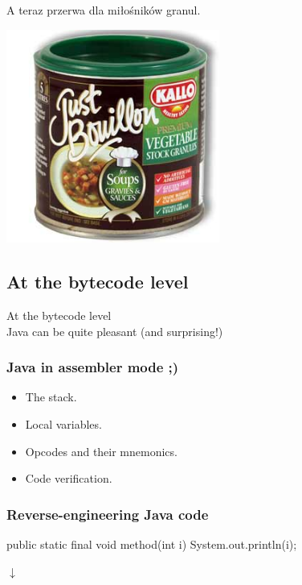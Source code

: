 \documentclass[compress]{beamer}
\begin{document}
\begin{frame}[plain]
    \begin{center}
    A teraz przerwa dla miłośników granul.
    
    \bigskip\pause\includegraphics[width=7cm]{figures/granules}
    \end{center}
\end{frame}

\subsection[Bytecode]{At the bytecode level}

\begin{frame}
    \begin{center}
    At the bytecode level\\
    {\color{blue} Java can be quite pleasant (and surprising!)}
    \end{center}
\end{frame}

\begin{frame}
    \frametitle{Java in assembler mode ;)}

    \begin{itemize}[<+->]
        \item The stack.
        \item Local variables.
        \item Opcodes and their mnemonics.
        \item Code verification.
    \end{itemize}
\end{frame}

\begin{frame}[fragile]
    \frametitle{Reverse-engineering Java code}

    \begin{javablock}
    public static final void method(int i)
    {
        System.out.println(i);
    }
    \end{javablock}

    \begin{center} $\downarrow$ \end{center}\pause

\end{frame}
\end{document}
